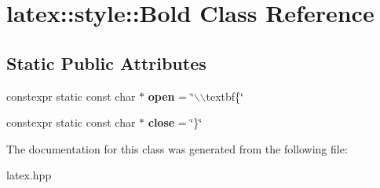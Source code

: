 \hypertarget{classlatex_1_1style_1_1Bold}{\section{latex\-:\-:style\-:\-:\-Bold \-Class \-Reference}
\label{classlatex_1_1style_1_1Bold}
}
\subsection*{\-Static \-Public \-Attributes}
\begin{DoxyCompactItemize}
\item 
\hypertarget{classlatex_1_1style_1_1Bold_a3802de3a45ede8381489dc53c647fb82}{constexpr static const char $\ast$ {\bfseries open} = \char`\"{}$\backslash$$\backslash$textbf\{\char`\"{}}\label{classlatex_1_1style_1_1Bold_a3802de3a45ede8381489dc53c647fb82}

\item 
\hypertarget{classlatex_1_1style_1_1Bold_ad81c547be1c60043179f03e24802a64c}{constexpr static const char $\ast$ {\bfseries close} = \char`\"{}\}\char`\"{}}\label{classlatex_1_1style_1_1Bold_ad81c547be1c60043179f03e24802a64c}

\end{DoxyCompactItemize}


\-The documentation for this class was generated from the following file\-:\begin{DoxyCompactItemize}
\item 
latex.\-hpp\end{DoxyCompactItemize}
